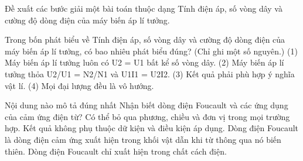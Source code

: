 \begin{bt}
Đề xuất các bước giải một bài toán thuộc dạng Tính điện áp, số vòng dây và cường độ dòng điện của máy biến áp lí tưởng.
\end{bt}

\begin{ex}
Trong bốn phát biểu về Tính điện áp, số vòng dây và cường độ dòng điện của máy biến áp lí tưởng, có bao nhiêu phát biểu đúng? (Chỉ ghi một số nguyên.) (1) Máy biến áp lí tưởng luôn có U2 = U1 bất kể số vòng dây. (2) Máy biến áp lí tưởng thỏa U2/U1 = N2/N1 và U1I1 = U2I2. (3) Kết quả phải phù hợp ý nghĩa vật lí. (4) Mọi đại lượng đều là vô hướng.
\end{ex}

\begin{ex}
Nội dung nào mô tả đúng nhất Nhận biết dòng điện Foucault và các ứng dụng của cảm ứng điện từ?
\choice
{Có thể bỏ qua phương, chiều và đơn vị trong mọi trường hợp.}
{Kết quả không phụ thuộc dữ kiện và điều kiện áp dụng.}
{\True Dòng điện Foucault là dòng điện cảm ứng xuất hiện trong khối vật dẫn khi từ thông qua nó biến thiên.}
{Dòng điện Foucault chỉ xuất hiện trong chất cách điện.}
\end{ex}

